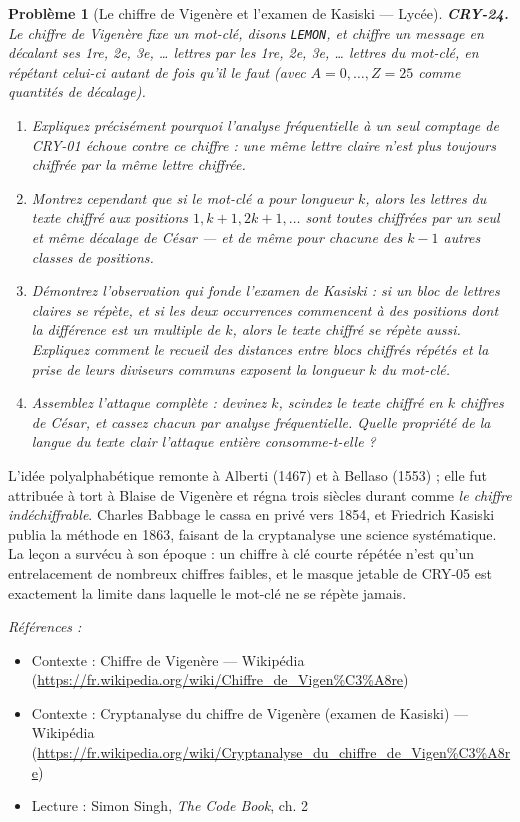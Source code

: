 \documentclass[11pt]{article}
\newtheorem{problem}{Problème}
\newenvironment{refs}{\par\small\noindent\emph{Références :}\begin{itemize}\setlength\itemsep{0pt}}{\end{itemize}\normalsize}
\begin{document}
\begin{problem}[{Le chiffre de Vigenère et l'examen de Kasiski --- Lycée}]
\textbf{CRY-24.} Le chiffre de Vigenère fixe un mot-clé, disons \texttt{LEMON}, et
chiffre un message en décalant ses 1re, 2e, 3e, \dots{} lettres
par les 1re, 2e, 3e, \dots{} lettres du mot-clé, en répétant
celui-ci autant de fois qu'il le faut (avec $A = 0, \dots, Z = 25$ comme quantités de
décalage).
\begin{enumerate}
\item[(a)] Expliquez précisément pourquoi l'analyse fréquentielle à un seul comptage de CRY-01
échoue contre ce chiffre : une même lettre claire n'est plus toujours chiffrée par la même
lettre chiffrée.
\item[(b)] Montrez cependant que si le mot-clé a pour longueur $k$, alors les lettres du texte
chiffré aux positions $1, k+1, 2k+1, \dots$ sont toutes chiffrées par un seul et même
décalage de César --- et de même pour chacune des $k-1$ autres classes de positions.
\item[(c)] Démontrez l'observation qui fonde l'examen de Kasiski : si un bloc de lettres claires se
répète, et si les deux occurrences commencent à des positions dont la différence est un
multiple de $k$, alors le texte chiffré se répète aussi. Expliquez comment le recueil des
distances entre blocs chiffrés répétés et la prise de leurs diviseurs communs exposent la
longueur $k$ du mot-clé.
\item[(d)] Assemblez l'attaque complète : devinez $k$, scindez le texte chiffré en $k$ chiffres
de César, et cassez chacun par analyse fréquentielle. Quelle propriété de la langue du texte
clair l'attaque entière consomme-t-elle ?
\end{enumerate}

\end{problem}

\noindent L'idée polyalphabétique remonte à Alberti (1467) et à Bellaso
(1553) ; elle fut attribuée à tort à Blaise de Vigenère et régna trois siècles durant
comme \textit{le chiffre indéchiffrable}. Charles Babbage le cassa en privé vers 1854, et
Friedrich Kasiski publia la méthode en 1863, faisant de la cryptanalyse une science
systématique. La leçon a survécu à son époque : un chiffre à clé courte répétée n'est qu'un
entrelacement de nombreux chiffres faibles, et le masque jetable de CRY-05 est exactement la
limite dans laquelle le \og{} mot-clé \fg{} ne se répète jamais.

\begin{refs}
\item Contexte : Chiffre de Vigenère --- Wikipédia (\url{https://fr.wikipedia.org/wiki/Chiffre_de_Vigen%C3%A8re})
\item Contexte : Cryptanalyse du chiffre de Vigenère (examen de Kasiski) --- Wikipédia (\url{https://fr.wikipedia.org/wiki/Cryptanalyse_du_chiffre_de_Vigen%C3%A8re})
\item Lecture : Simon Singh, \textit{The Code Book}, ch. 2
\end{refs}
\end{document}
